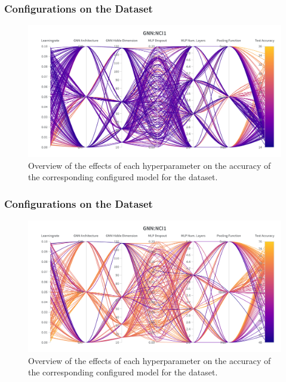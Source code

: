 \subsubsection{\gnn Configurations on the \enzymes Dataset}
\begin{figure}[H]
    \centering
    \includegraphics[width=\textwidth, trim={0 75 0 150}, clip]{Figures/hyperparameter_gnn_enzymes.png}
    \caption{Overview of the effects of each hyperparameter on the accuracy of the corresponding configured \gnn model for the \enzymes dataset.}
\end{figure}

\subsubsection{\gnn Configurations on the \imdb Dataset}
\begin{figure}[H]
    \centering
    \includegraphics[width=\textwidth, trim={0 75 0 150}, clip]{Figures/hyperparameter_gnn_imdb.png}
    \caption{Overview of the effects of each hyperparameter on the accuracy of the corresponding configured \gnn model for the \imdb dataset.}
\end{figure}
\clearpage

